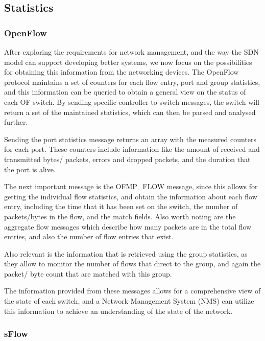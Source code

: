 \subsection {Statistics}

\subsubsection {OpenFlow}

After exploring the requirements for network management, and the way the SDN model can support developing better systems, we now focus on the possibilities for
obtaining this information from the networking devices. The OpenFlow protocol maintains a set of counters for each flow entry, port and group statistics, and this
information can be queried to obtain a general view on the status of each OF switch. By sending specific controller-to-switch messages, the switch will return a set
of the maintained statistics, which can then be parsed and analysed further. 

\par Sending the port statistics message returns an array with the measured counters for each port. These counters include information like the amount of received
and transmitted bytes/ packets, errors and dropped packets, and the duration that the port is alive. 

\par The next important message is the \textsc{OFMP\_FLOW} message, since this allows for getting the individual flow statistics, and obtain the information about
each flow entry, including the time that it has been set on the switch, the number of packets/bytes in the flow, and the match fields. Also worth noting are the 
aggregate flow messages which describe how many packets are in the total flow entries, and also the number of flow entries that exist.

\par Also relevant is the information that is retrieved using the group statistics, as they allow to monitor the number of flows that direct to the group, and again
the packet/ byte count that are matched with this group.

\par The information provided from these messages allows for a comprehensive view of the state of each switch, and a Network Management System (NMS) can utilize
this information to achieve an understanding of the state of the network. 

\subsubsection {sFlow} \label{sec:sflow}


